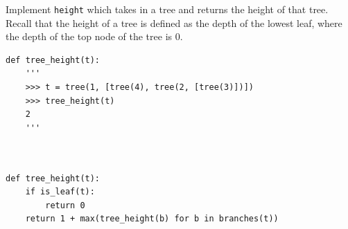 \begin{blocksection}
\question Implement \lstinline$height$ which takes in a 
tree and returns the height of that tree. Recall that the
height of a tree is defined as the depth of the lowest leaf,
where the depth of the top node of the tree is 0.

\begin{lstlisting}
def tree_height(t):
    '''
    >>> t = tree(1, [tree(4), tree(2, [tree(3)])])
    >>> tree_height(t)
    2
    '''
    
\end{lstlisting}

\begin{solution}[2in]
\begin{lstlisting}

def tree_height(t):
    if is_leaf(t):
        return 0
    return 1 + max(tree_height(b) for b in branches(t))
\end{lstlisting}
\end{solution}
\end{blocksection}
